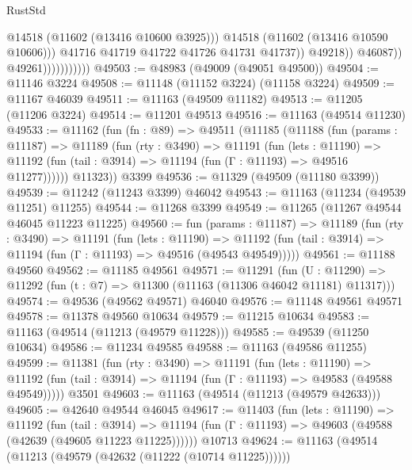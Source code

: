 \begin{lexlean}{RustStd}
\begin{coremodule}
                                          @14518
                                          (@11602 (@13416 @10600 @3925)))
                                        @14518
                                        (@11602 (@13416 @10590 @10606)))
                                      @41716
                                      @41719
                                      @41722
                                      @41726
                                      @41731
                                      @41737))
                                  @49218))
                              @46087))
                          @49261)))))))))))
@49503 := @48983 (@49009 (@49051 @49500))
@49504 := @11146 @3224
@49508 := @11148 (@11152 @3224) (@11158 @3224)
@49509 := @11167 @46039
@49511 := @11163 (@49509 @11182)
@49513 := @11205 (@11206 @3224)
@49514 := @11201 @49513
@49516 := @11163 (@49514 @11230)
@49533 := @11162
    (fun (fn : @89) =>
    @49511
      (@11185
        (@11188
          (fun (params : @11187) =>
          @11189
            (fun (rty : @3490) =>
            @11191
              (fun (lets : @11190) =>
              @11192 (fun (tail : @3914) => @11194 (fun (Γ : @11193) => @49516 @11277))))))
        @11323))
    @3399
@49536 := @11329 (@49509 (@11180 @3399))
@49539 := @11242 (@11243 @3399) @46042
@49543 := @11163 (@11234 (@49539 @11251) @11255)
@49544 := @11268 @3399
@49549 := @11265 (@11267 @49544 @46045 @11223 @11225)
@49560 := fun (params : @11187) =>
  @11189
    (fun (rty : @3490) =>
    @11191
      (fun (lets : @11190) =>
      @11192 (fun (tail : @3914) => @11194 (fun (Γ : @11193) => @49516 (@49543 @49549)))))
@49561 := @11188 @49560
@49562 := @11185 @49561
@49571 := @11291
    (fun (U : @11290) => @11292 (fun (t : @7) => @11300 (@11163 (@11306 @46042 @11181) @11317)))
@49574 := @49536 (@49562 @49571) @46040
@49576 := @11148 @49561 @49571
@49578 := @11378 @49560 @10634
@49579 := @11215 @10634
@49583 := @11163 (@49514 (@11213 (@49579 @11228)))
@49585 := @49539 (@11250 @10634)
@49586 := @11234 @49585
@49588 := @11163 (@49586 @11255)
@49599 := @11381
    (fun (rty : @3490) =>
    @11191
      (fun (lets : @11190) =>
      @11192 (fun (tail : @3914) => @11194 (fun (Γ : @11193) => @49583 (@49588 @49549)))))
    @3501
@49603 := @11163 (@49514 (@11213 (@49579 @42633)))
@49605 := @42640 @49544 @46045
@49617 := @11403
    (fun (lets : @11190) =>
    @11192
      (fun (tail : @3914) =>
      @11194 (fun (Γ : @11193) => @49603 (@49588 (@42639 (@49605 @11223 @11225))))))
    @10713
@49624 := @11163 (@49514 (@11213 (@49579 (@42632 (@11222 (@10714 @11225))))))

\end{coremodule}
\end{lexlean}
